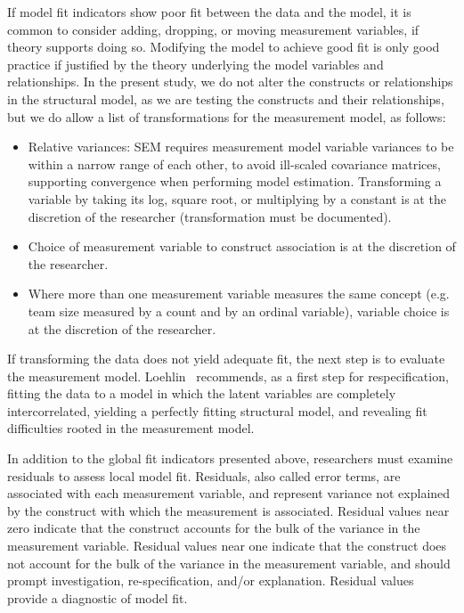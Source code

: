 If model fit indicators show poor fit between the data and the model, it is common to consider adding, dropping, or moving measurement variables, if theory supports doing so. Modifying the model to achieve good fit is only good practice if justified by the theory underlying the model variables and relationships. In the present study, we do not alter the constructs or relationships in the structural model, as we are testing the constructs and their relationships, but we do allow a list of transformations for the measurement model, as follows:
\begin{itemize}
	\item Relative variances: SEM requires measurement model variable variances to be within a narrow range of each other, to avoid ill-scaled covariance matrices, supporting convergence when performing model estimation. Transforming a variable by taking its log, square root, or multiplying by a constant is at the discretion of the researcher (transformation must be documented).
	\item Choice of measurement variable to construct association is at the discretion of the researcher. 
	\item Where more than one measurement variable measures the same concept (e.g. team size measured by a count and by an ordinal variable), variable choice is at the discretion of the researcher.
\end{itemize} 

If transforming the data does not yield adequate fit, the next step is to evaluate the measurement model. Loehlin~\cite{loehlin1986latent} recommends, as a first step for respecification,  fitting the data to a model in which the latent variables are completely intercorrelated, yielding a perfectly fitting structural model, and revealing fit difficulties rooted in the measurement model. 

In addition to the global fit indicators presented above, researchers must examine residuals to assess local model fit. Residuals, also called error terms, are associated with each measurement variable, and represent variance not explained by the construct with which the measurement is associated. Residual values near zero indicate that the construct accounts for the bulk of the variance in the measurement variable. Residual values near one indicate that the construct does not account for the bulk of the variance in the measurement variable, and should prompt investigation, re-specification, and/or explanation. Residual values provide a diagnostic of model fit.

